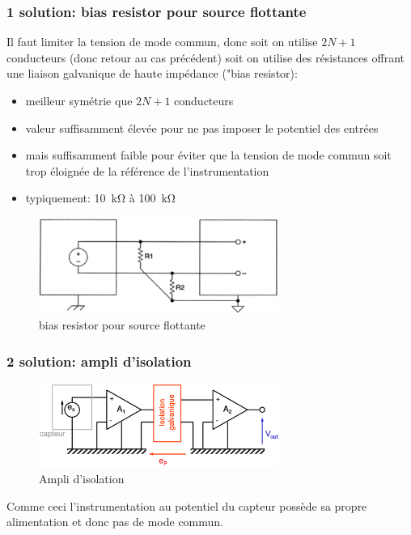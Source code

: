 \subsubsection{1 solution: bias resistor pour source flottante}
Il faut limiter la tension de mode commun, donc soit on utilise \(2N+1\) conducteurs (donc retour au cas précédent) soit on utilise des résistances offrant une liaison galvanique de haute impédance ("bias resistor):
\begin{itemize}
	\item meilleur symétrie que \(2N+1\) conducteurs
	\item valeur suffisamment élevée pour ne pas imposer le potentiel des entrées
	\item mais suffisamment faible pour éviter que la tension de mode commun soit trop éloignée de la référence de l’instrumentation
	\item typiquement: \SI{10}{\kilo\ohm} à \SI{100}{\kilo\ohm}
\end{itemize}
\begin{figure}[H] 
	\centering 
	\includegraphics[width=0.7\textwidth,height=10\baselineskip,keepaspectratio]{ch3/image21} 
	\caption{bias resistor pour source flottante} 
\end{figure}
\subsubsection{2 solution: ampli d'isolation}
\begin{figure}[H] 
	\centering 
	\includegraphics[width=0.7\textwidth,height=10\baselineskip,keepaspectratio]{ch3/image22} 
	\caption{Ampli d'isolation} 
\end{figure}
Comme ceci l'instrumentation au potentiel du capteur possède sa propre alimentation et donc pas de mode commun.
